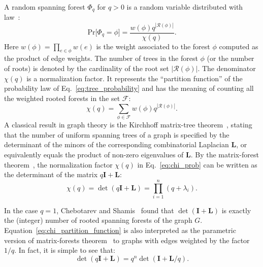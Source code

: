 \documentclass[10pt,aps,pre,twocolumn,nofootinbib,superscriptaddress,longbibliography]{revtex4-2}
\newcommand{\bI}{\mathbf{I}}
\newcommand{\bL}{\mathbf{L}}
\begin{document}
A random spanning forest $\Phi_q$ for $q>0$ is a random variable distributed with law~\cite{avena2018}:
\begin{equation}\label{eq:tree_probability}
	\textrm{Pr}\lbrack \Phi_q=\phi\rbrack = \frac{w(\phi)q^{|\mathcal{R}(\phi)|}} {\chi(q)}.
\end{equation}
Here $w(\phi) = \prod_{e \in \phi} w(e)$ is the weight associated to the forest $\phi$ computed as the product of edge weights.
The number of trees in the forest $\phi$ (or the number of roots) is denoted by the cardinality of the root set $|\mathcal{R}(\phi)|$.
The denominator $\chi(q)$ is a normalization factor. It represents the ``partition function'' of the probability law of Eq.~\ref{eq:tree_probability} and has the meaning of counting all the weighted rooted forests in the set $\mathcal{F}$:
\begin{equation}\label{eq:chi_prob}
	\chi(q) = \sum_{\phi \in \mathcal{F}} w(\phi) q^{|\mathcal{R}(\phi)|}.
\end{equation}
A classical result in graph theory is the Kirchhoff matrix-tree theorem~\cite{lyons2017probability,avena2018,avena2018a}, stating that the number of uniform spanning trees of a graph is specified by the determinant of the minors of the corresponding combinatorial Laplacian $\bL$, or equivalently equals the product of non-zero eigenvalues of $\bL$.
By the matrix-forest theorem~\cite{chebotarev2002forest,chebotarev2006matrix}, the normalization factor $\chi(q)$ in Eq.~\ref{eq:chi_prob} can be written as the determinant of the matrix $q\bI + \bL$:
\begin{equation}\label{eq:chi_partition_function}
	\chi(q) = \det(q\bI + \bL) = \prod_{i=1}^{n}(q+\lambda_i).
\end{equation}

In the case $q=1$, Chebotarev and Shamis~\cite{chebotarev2002forest} found that $\det(\bI + \bL)$ is exactly the (integer) number of rooted spanning forests of the graph $G$.
Equation~\ref{eq:chi_partition_function} is also interpreted as the parametric version of matrix-forests theorem~\cite{agaev2000} to graphs with edges weighted by the factor $1/q$.
In fact, it is simple to see that:
\begin{equation}
	\det(q\bI + \bL) = q^n \det(\bI + \bL/q).
\end{equation}
\end{document}
